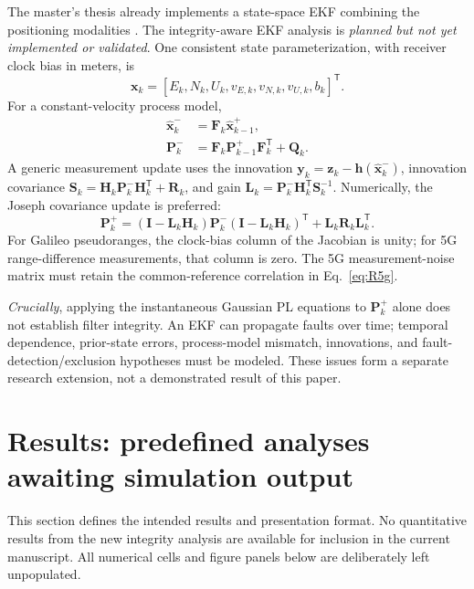 \documentclass[pdflatex,sn-mathphys-num]{sn-jnl}
\newcommand{\vect}[1]{\boldsymbol{#1}}
\newcommand{\mat}[1]{\mathbf{#1}}
\newcommand{\trans}{^{\mathsf T}}
\begin{document}
The master's thesis already implements a state-space EKF combining the
positioning modalities \cite{SanchezHerederoThesis}. The integrity-aware
EKF analysis is \emph{planned but not yet implemented or validated}.
One consistent state parameterization, with receiver clock bias in
meters, is
\begin{equation}\label{eq:ekf-state}
 \vect{x}_k=[E_k,N_k,U_k,v_{E,k},v_{N,k},v_{U,k},b_k]\trans.
\end{equation}
For a constant-velocity process model,
\begin{align}
 \hat{\vect{x}}_{k}^{-}&=\mat{F}_k\hat{\vect{x}}_{k-1}^{+},
 \label{eq:ekf-pred1}\\
 \mat{P}_{k}^{-}&=\mat{F}_k\mat{P}_{k-1}^{+}\mat{F}_k\trans
 +\mat{Q}_k.\label{eq:ekf-pred2}
\end{align}
A generic measurement update uses the innovation
$\vect{y}_k=\vect{z}_k-\vect{h}(\hat{\vect{x}}_k^-)$,
innovation covariance $\mat{S}_k=\mat{H}_k\mat{P}_k^-
\mat{H}_k\trans+\mat{R}_k$, and gain
$\mat{L}_k=\mat{P}_k^-\mat{H}_k\trans\mat{S}_k^{-1}$.
Numerically, the Joseph covariance update is preferred:
\begin{equation}\label{eq:joseph}
 \mat{P}_k^+=(\mat{I}-\mat{L}_k\mat{H}_k)\mat{P}_k^-
 (\mat{I}-\mat{L}_k\mat{H}_k)\trans+
 \mat{L}_k\mat{R}_k\mat{L}_k\trans.
\end{equation}
For Galileo pseudoranges, the clock-bias column of the Jacobian is
unity; for 5G range-difference measurements, that column is zero.
The 5G measurement-noise matrix must retain the common-reference
correlation in Eq.~\eqref{eq:R5g}.

\emph{Crucially}, applying the instantaneous Gaussian PL equations to
$\mat{P}_k^+$ alone does not establish filter integrity. An EKF can
propagate faults over time; temporal dependence, prior-state errors,
process-model mismatch, innovations, and fault-detection/exclusion
hypotheses must be modeled. These issues form a separate research
extension, not a demonstrated result of this paper.

\section{Results: predefined analyses awaiting simulation output}\label{sec:results}

This section defines the intended results and presentation format.
No quantitative results from the new integrity analysis are available
for inclusion in the current manuscript. All numerical cells and
figure panels below are deliberately left unpopulated.
\end{document}
